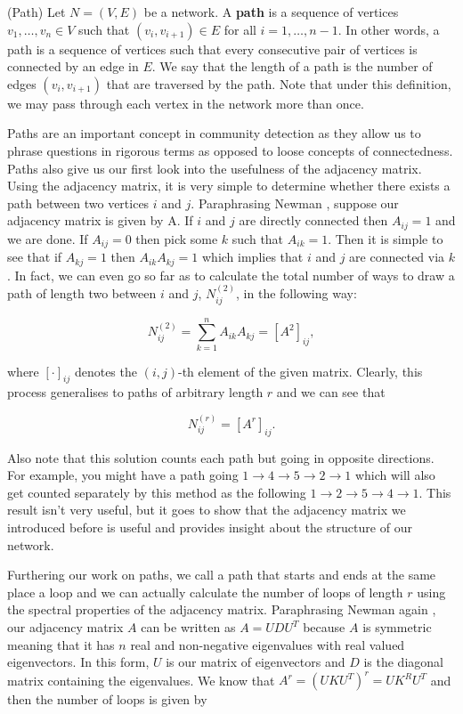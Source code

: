 \begin{definition}{(Path)}
    Let $N = (V, E)$ be a network. A \textbf{path} is a sequence of vertices $v_1, \dots, v_n \in V$ such that $(v_i, v_{i+1}) \in E$ for all $i = 1, \dots, n-1$. In other words, a path is a sequence of vertices such that every consecutive pair of vertices is connected by an edge in $E$. We say that the length of a path is the number of edges $(v_i, v_{i+1})$ that are traversed by the path. Note that under this definition, we may pass through each vertex in the network more than once.
\end{definition}

Paths are an important concept in community detection as they allow us to phrase questions in rigorous terms as opposed to loose concepts of connectedness. Paths also give us our first look into the usefulness of the adjacency matrix. Using the adjacency matrix, it is very simple to determine whether there exists a path between two vertices $i$ and $j$. Paraphrasing Newman \cite[137]{newman10}, suppose our adjacency matrix is given by A. If $i$ and $j$ are directly connected then $A_{ij} = 1$ and we are done. If $A_{ij} = 0$ then pick some $k$ such that $A_{ik} = 1$. Then it is simple to see that if $A_{kj} = 1$ then $A_{ik}A_{kj} = 1$ which implies that $i$ and $j$ are connected via $k$. In fact, we can even go so far as to calculate the total number of ways to draw a path of length two between $i$ and $j$, $N^{(2)}_{ij}$, in the following way:

$$
N_{ij}^{(2)} = \sum_{k=1}^n A_{ik}A_{kj} = [A^2]_{ij},
$$

\noindent
where $[\cdot]_{ij}$ denotes the $(i, j)$-th element of the given matrix. Clearly, this process generalises to paths of arbitrary length $r$ and we can see that

$$
N_{ij}^{(r)} = [A^r]_{ij}.
$$

\noindent
Also note that this solution counts each path but going in opposite directions. For example, you might have a path going $1 \rightarrow 4 \rightarrow 5 \rightarrow 2 \rightarrow 1$ which will also get counted separately by this method as the following $1 \rightarrow 2 \rightarrow 5 \rightarrow 4 \rightarrow 1$. This result isn't very useful, but it goes to show that the adjacency matrix we introduced before is useful and provides insight about the structure of our network. 

Furthering our work on paths, we call a path that starts and ends at the same place a loop and we can actually calculate the number of loops of length $r$ using the spectral properties of the adjacency matrix. Paraphrasing Newman again \cite[137]{newman10}, our adjacency matrix $A$ can be written as $A = UDU^T$ because $A$ is symmetric meaning that it has $n$ real and non-negative eigenvalues with real valued eigenvectors. In this form, $U$ is our matrix of eigenvectors and $D$ is the diagonal matrix containing the eigenvalues. We know that $A^r = (UKU^T)^r = UK^RU^T$ and then the number of loops is given by

